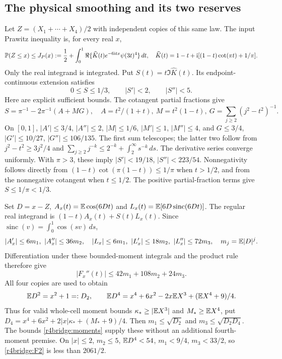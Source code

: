 \subsection{The physical smoothing and its two reserves}
Let $Z=(X_1+\cdots+X_4)/2$ with independent copies of this same law.
The input Prawitz inequality is, for every real $x$,
\begin{equation}
 \mathbb P(Z\le x)\le J_P(x):=\frac12+
 \int_0^1\Re\{\widehat K(t)e^{-6\mathrm itx}\psi(3t)^4\}\,dt,
 \quad \widehat K(t)=1-t+\mathrm i[(1-t)\cot(\pi t)+1/\pi].
 \label{r4bridge:prawitz}
\end{equation}
Only the real integrand is integrated. Put $S(t)=t\Im\widehat K(t)$.
Its endpoint-continuous extension satisfies
\begin{equation}
 0\le S\le1/3,\qquad |S'|<2,\qquad |S''|<5.
 \label{r4bridge:kernel}
\end{equation}
Here are explicit sufficient bounds. The cotangent partial fractions give
\[
 S=\pi^{-1}-2\pi^{-1}(A+MG),\quad
 A=t^2/(1+t),\ M=t^2(1-t),\
 G=\sum_{j\ge2}(j^2-t^2)^{-1}.
\]
On $[0,1]$,
$|A'|\le3/4$, $|A''|\le2$, $|M|\le1/6$,
$|M'|\le1$, $|M''|\le4$, and
$G\le3/4$, $|G'|\le10/27$, $|G''|\le106/135$.
The first sum telescopes; the latter two follow from
$j^2-t^2\ge3j^2/4$ and
$\sum_{j\ge2}j^{-k}\le2^{-k}+\int_2^\infty s^{-k}\,ds$.
The derivative series converge uniformly. With $\pi>3$, these imply
$|S'|<19/18$, $|S''|<223/54$. Nonnegativity follows directly from
$(1-t)\cot(\pi(1-t))\le1/\pi$ when $t>1/2$, and from the
nonnegative cotangent when $t\le1/2$. The positive partial-fraction
terms give $S\le1/\pi<1/3$.

Set $D=x-Z$, $A_x(t)=\mathbb E\cos(6Dt)$ and
$L_x(t)=\mathbb E[6D\operatorname{sinc}(6Dt)]$. The regular real integrand
is $(1-t)A_x(t)+S(t)L_x(t)$. Since
$\operatorname{sinc}(v)=\int_0^1\cos(sv)\,ds$,
\[
 |A_x'|\le6m_1,\ |A_x''|\le36m_2,\quad
 |L_x|\le6m_1,\ |L_x'|\le18m_2,\ |L_x''|\le72m_3,
 \quad m_j=\mathbb E|D|^j.
\]
Differentiation under these bounded-moment integrals and the product rule
therefore give
\begin{equation}
 |F_x''(t)|\le42m_1+108m_2+24m_3.\label{r4bridge:F2}
\end{equation}
All four copies are used to obtain
\[
 \mathbb E D^2=x^2+1=:D_2,\qquad
 \mathbb E D^4=x^4+6x^2-2x\mathbb E X^3+(\mathbb E X^4+9)/4.
\]
Thus for valid whole-cell moment bounds $\kappa_*\ge|\mathbb E X^3|$ and
$M_*\ge\mathbb E X^4$, put
$D_4=x^4+6x^2+2|x|\kappa_*+(M_*+9)/4$.
Then $m_1\le\sqrt{D_2}$ and $m_3\le\sqrt{D_2D_4}$.
The bounds \eqref{r4bridge:moments} supply these without an additional
fourth-moment premise. On $|x|\le2$, $m_2\le5$, $\mathbb E D^4<54$,
$m_1<9/4$, $m_3<33/2$, so \eqref{r4bridge:F2} is less than $2061/2$.

